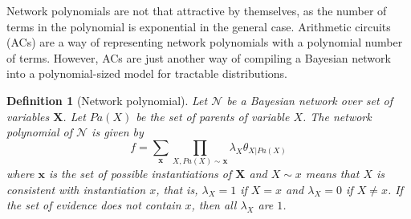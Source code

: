 \documentclass{amsart}
\theoremstyle{plain}
\newcounter{dummy-def}\numberwithin{dummy-def}{section}
\newtheorem{definition}[dummy-def]{Definition}
\newcounter{dummy-thm}\numberwithin{dummy-thm}{section}
\newcounter{dummy-prop}\numberwithin{dummy-prop}{section}
\newcounter{dummy-ex}\numberwithin{dummy-ex}{section}
\newcounter{dummy-eg}\numberwithin{dummy-eg}{section}
\numberwithin{equation}{section}
\begin{document}
Network polynomials are not that attractive by themselves, as the number of terms in the polynomial
is exponential in the general case. Arithmetic circuits (ACs) are a way of representing network
polynomials with a polynomial number of terms. However, ACs are just another way of compiling a
Bayesian network into a polynomial-sized model for tractable distributions.

\begin{definition}[Network polynomial] Let $\mathcal{N}$ be a Bayesian network over set of
  variables $\mathbf{X}$. Let $Pa(X)$ be the set of parents of variable $X$. The network polynomial
  of $\mathcal{N}$ is given by
  \begin{equation*}
    f=\sum_{\mathbf{x}} \prod_{X, Pa(X) \sim \mathbf{x}} \lambda_X \theta_{X|Pa(X)}
  \end{equation*}
  where $\mathbf{x}$ is the set of possible instantiations of $\mathbf{X}$ and $X \sim x$ means
  that $X$ is consistent with instantiation $x$, that is, $\lambda_X = 1$ if $X=x$ and $\lambda_X =
  0$ if $X\neq x$. If the set of evidence does not contain $x$, then all $\lambda_X$ are $1$.
\end{definition}


\newpage
\appendix

\newpage

\printbibliography[]
\end{document}
